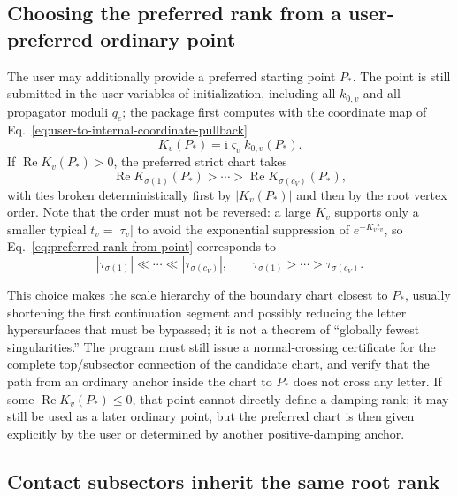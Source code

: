 \documentclass[11pt,a4paper]{article}
\newcommand{\ii}{\mathrm i}
\begin{document}
\subsection{Choosing the preferred rank from a user-preferred ordinary point}

The user may additionally provide a preferred starting point $P_*$. The point is still submitted in the user variables of initialization, including all $k_{0,v}$ and all propagator moduli $q_e$; the package first computes with the coordinate map of Eq.~\eqref{eq:user-to-internal-coordinate-pullback}
\begin{equation}
 K_v(P_*)=\ii\varsigma_vk_{0,v}(P_*).
\end{equation}
If $\operatorname{Re}K_v(P_*)>0$, the preferred strict chart takes
\begin{equation}
 \operatorname{Re}K_{\sigma(1)}(P_*)>\cdots>
 \operatorname{Re}K_{\sigma(c_V)}(P_*),
 \label{eq:preferred-rank-from-point}
\end{equation}
with ties broken deterministically first by $|K_v(P_*)|$ and then by the root vertex order. Note that the order must not be reversed: a large $K_v$ supports only a smaller typical $t_v=|\tau_v|$ to avoid the exponential suppression of $e^{-K_vt_v}$, so Eq.~\eqref{eq:preferred-rank-from-point} corresponds to
\begin{equation}
 |\tau_{\sigma(1)}|\ll\cdots\ll|\tau_{\sigma(c_V)}|,
 \qquad
 \tau_{\sigma(1)}>\cdots>\tau_{\sigma(c_V)}.
\end{equation}

This choice makes the scale hierarchy of the boundary chart closest to $P_*$, usually shortening the first continuation segment and possibly reducing the letter hypersurfaces that must be bypassed; it is not a theorem of ``globally fewest singularities.'' The program must still issue a normal-crossing certificate for the complete top/subsector connection of the candidate chart, and verify that the path from an ordinary anchor inside the chart to $P_*$ does not cross any letter. If some $\operatorname{Re}K_v(P_*)\leq0$, that point cannot directly define a damping rank; it may still be used as a later ordinary point, but the preferred chart is then given explicitly by the user or determined by another positive-damping anchor.

\subsection{Contact subsectors inherit the same root rank}
\end{document}
